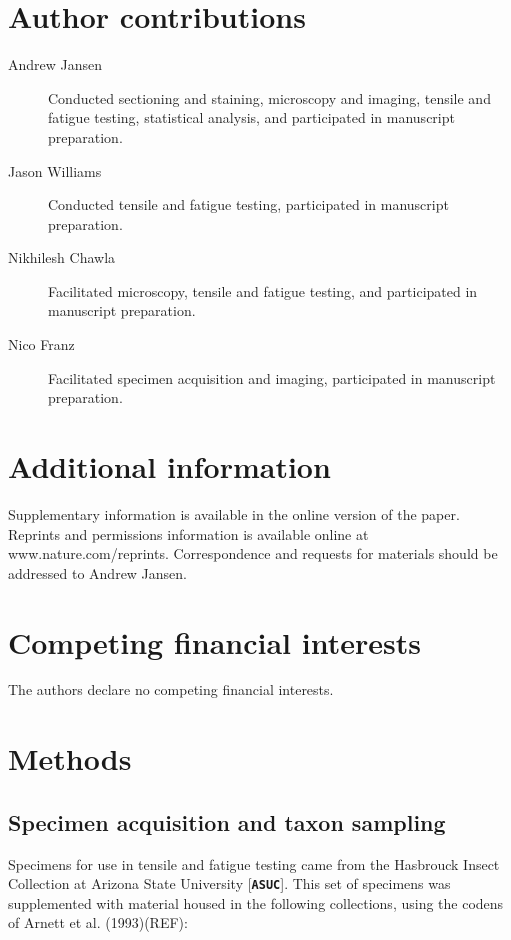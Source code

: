 \documentclass[twocolumn, linenumbers, superscriptaddress, nofootinbib]{revtex4-1}
\begin{document}
	\section*{Author contributions}
		\begin{description}
		\item[Andrew Jansen] Conducted sectioning and staining, microscopy and imaging, tensile and fatigue testing, statistical analysis, and participated in manuscript preparation.
		\item[Jason Williams] Conducted tensile and fatigue testing, participated in manuscript preparation.
		\item[Nikhilesh Chawla] Facilitated microscopy, tensile and fatigue testing, and participated in manuscript preparation.
		\item[Nico Franz] Facilitated specimen acquisition and imaging, participated in manuscript preparation.
		\end{description} 
	
	\section*{Additional information}
		Supplementary information is available in the online version of the paper.
		Reprints and permissions information is available online at www.nature.com/reprints.
		Correspondence and requests for materials should be addressed to Andrew Jansen.
	
	\section*{Competing financial interests}
		The authors declare no competing financial interests.
	
	\newpage

	\section*{Methods}
		\subsection*{Specimen acquisition and taxon sampling}
			Specimens for use in tensile and fatigue testing came from the Hasbrouck Insect Collection at Arizona State University [\textbf{\texttt{ASUC}}].  This set of specimens was supplemented with material housed in the following collections, using the codens of Arnett	et al. (1993)(REF):
			
\end{document}
